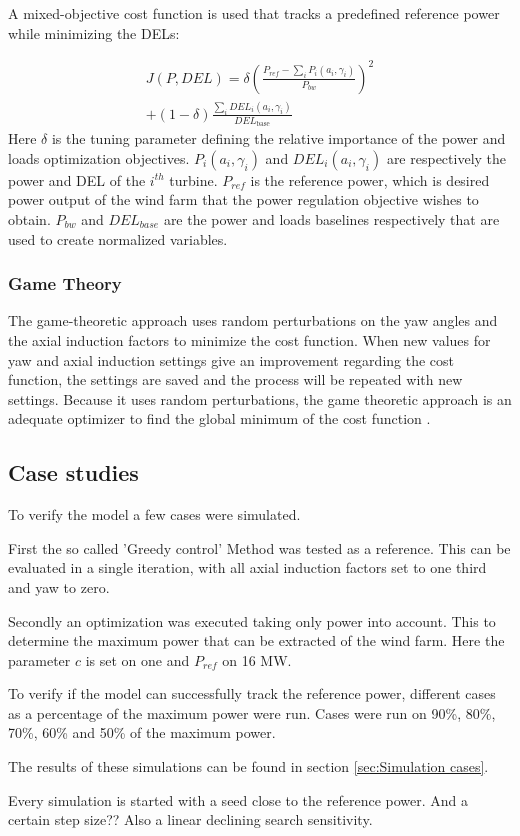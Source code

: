 A mixed-objective cost function is used that tracks a predefined reference power while minimizing the DELs: 

\begin{equation}
\begin{aligned}
J(P,DEL) = \delta\left(\frac{P_{ref}-\sum\nolimits_i P_i(a_i,\gamma_i)}{P_{bw}}\right)^2 \\ +
 (1-\delta)\frac{\sum\nolimits_i DEL_i(a_i,\gamma_i)}{DEL_\text{{base}}}
\end{aligned}
 \label{eq:costf}
\end{equation}
Here $\delta$ is the tuning parameter defining the relative importance of the power and loads optimization objectives. $P_i(a_i,\gamma_i)$ and $DEL_i(a_i,\gamma_i)$ are respectively the power and DEL of the $i^{th}$ turbine. $P_{ref}$ is the reference power, which is desired power output of the wind farm that the power regulation objective wishes to obtain. $P_{bw}$ and $DEL_{base}$ are the power and loads baselines respectively  that are used to create normalized variables.


\subsubsection{Game Theory} \label{sec:gametheory}
The game-theoretic approach uses random perturbations on the yaw angles and the axial induction factors to minimize the cost function. When new values for yaw and axial induction settings give an improvement regarding the cost function, the settings are saved and the process will be repeated with new settings. Because it uses random perturbations, the game theoretic approach is an adequate optimizer to find the global minimum of the cost function \cite{Dijk2016}.

\subsection{Case studies}
\label{sec:Case studies}
To verify the model a few cases were simulated.

First the so called 'Greedy control' Method was tested as a reference. This can be evaluated in a single iteration, with all axial induction factors set to one third and yaw to zero. 

Secondly an optimization was executed taking only power into account. This to determine the maximum power that can be extracted of the wind farm. Here the parameter $c$ is set on one and $P_{ref}$ on 16 MW. 

To verify if the model can successfully track the reference power, different cases as a percentage of the maximum power were run. Cases were run on 90\%, 80\%, 70\%, 60\% and 50\% of the maximum power.

The results of these simulations can be found in section \ref{sec:Simulation cases}.

Every simulation is started with a seed close to the reference power. And a certain step size?? Also a linear declining search sensitivity. 